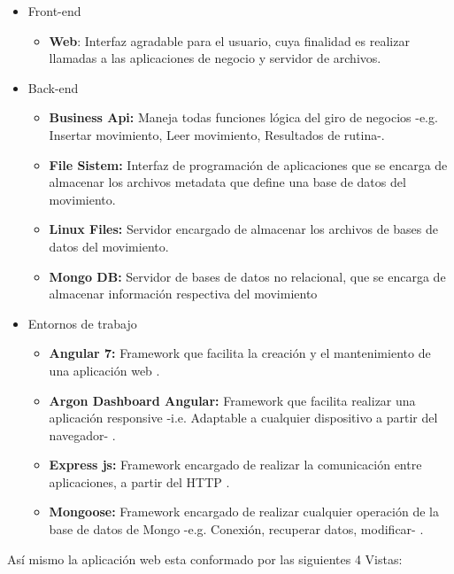 \begin{itemize}
\item Front-end
	\begin{itemize}
	\item \textbf{Web}: Interfaz agradable para el usuario, cuya finalidad es realizar llamadas a las aplicaciones de negocio y servidor de archivos.
	\end{itemize}
\item Back-end
	\begin{itemize}
	\item \textbf{Business Api:} Maneja todas funciones l\'ogica del giro de negocios -e.g. Insertar movimiento, Leer movimiento, Resultados de rutina-.
	\item \textbf{File Sistem:} Interfaz de programaci\'on de aplicaciones que se encarga de almacenar los archivos metadata que define una base de datos del movimiento.
		\item \textbf{Linux Files:} Servidor encargado de almacenar los archivos de bases de datos del movimiento.
		\item \textbf{Mongo DB:} Servidor de bases de datos no relacional, que se encarga de almacenar informaci\'on respectiva del movimiento
	\end{itemize}
\item Entornos de trabajo
\begin{itemize}
\item \textbf{Angular 7:} Framework que facilita la creaci\'on y el mantenimiento de una aplicaci\'on web \cite{angular2019}.
\item \textbf{Argon Dashboard Angular:} Framework que facilita realizar una aplicaci\'on responsive -i.e. Adaptable a cualquier dispositivo a partir del navegador- \cite{argonDash}.
\item \textbf{Express js:} Framework encargado de realizar la comunicaci\'on entre aplicaciones, a partir del \acrlong{HTTP} \cite{fileSistem2019}.
\item \textbf{Mongoose:} Framework encargado de realizar cualquier operaci\'on de la base de datos de Mongo -e.g. Conexi\'on, recuperar datos, modificar- \cite{mongoose2019}.
\end{itemize}
\end{itemize}
As\'i mismo la aplicaci\'on web esta conformado por las siguientes 4 Vistas:
